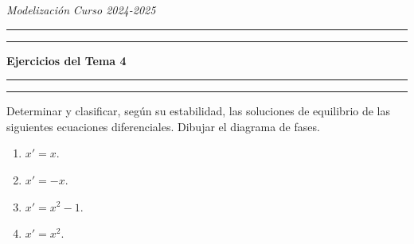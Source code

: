 \documentclass[11pt]{report}
\begin{document}
\noindent \textit{Modelización} \hfill \textit{Curso 2024-2025}

\vspace{-7mm}

\begin{center}

	\rule{\textwidth}{1.6pt}\vspace*{-\baselineskip}\vspace*{2pt} %
	\rule{\textwidth}{0.4pt} %
	
    \vspace{3mm}

	{\LARGE \textbf{Ejercicios del Tema 4}} %

    \vspace{2mm}
	
	\rule[0.66\baselineskip]{\textwidth}{0.4pt}\vspace*{-\baselineskip}\vspace{3.2pt} %
	\rule[0.66\baselineskip]{\textwidth}{1.6pt} %

\end{center}

\begin{exercise}
    Determinar y clasificar, según su estabilidad, las soluciones de equilibrio de las siguientes ecuaciones diferenciales. Dibujar el diagrama de fases.
    \begin{enumerate}
        \item $x'=x$.
        \item $x'=-x$.
        \item $x'=x^2-1$.
        \item $x'=x^2$.
    \end{enumerate}
\end{exercise}
\end{document}
